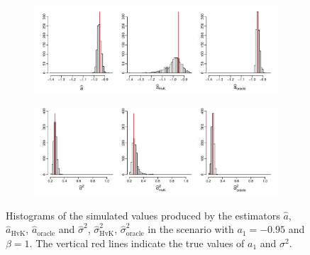 \begin{figure}[t!]
\centering
\begin{subfigure}[b]{\textwidth}
\includegraphics[width=\textwidth]{Plots/a_hat_histograms_a1=-95_T=500_slope=1_(q,K1,K2,M1,M2)=(25,2,10,20,30).pdf}
\end{subfigure}
\begin{subfigure}[b]{\textwidth}
\includegraphics[width=\textwidth]{Plots/lrv_histograms_a1=-95_T=500_slope=1_(q,K1,K2,M1,M2)=(25,2,10,20,30).pdf}
\end{subfigure}
\caption{Histograms of the simulated values produced by the estimators $\widehat{a}$, $\widehat{a}_{\text{HvK}}$, $\widehat{a}_{\text{oracle}}$ and $\widehat{\sigma}^2$, $\widehat{\sigma}^2_{\text{HvK}}$, $\widehat{\sigma}^2_{\text{oracle}}$ in the scenario with $a_1 = -0.95$ and $\beta = 1$. The vertical red lines indicate the true values of $a_1$ and $\sigma^2$.}\label{fig:hist_scenario1} 
\end{figure}


